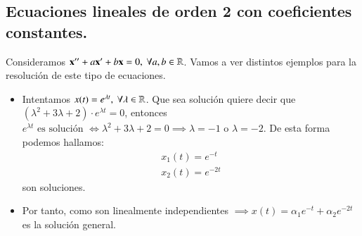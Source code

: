 \subsection{Ecuaciones lineales de orden 2 con coeficientes constantes.}
Consideramos $\mathbf{x}'' + a\mathbf{x}' + b\mathbf{x} = 0,\ \forall a,b \in \mathbb{R}$. Vamos a ver distintos ejemplos para la resolución de este tipo de ecuaciones.
\begin{eg}[Ecuación lineal de orden 2: $ \mbf{x}'' + 3\mbf{x}' + 2\mbf{x} = 0 $]
    \begin{itemize}
        \item Intentamos $x(t) = e^{\lambda t},\ \forall \lambda\in \R$. Que sea solución quiere decir que $(\lambda^2 + 3\lambda + 2)\cdot e^{\lambda t} = 0$, entonces $e^{\lambda t} \text{ es solución } \iff \lambda^2+3\lambda+2=0 \implies \lambda = -1 \text{ o } \lambda = -2 $. De esta forma podemos hallamos:
        \begin{gather*}
            x_1(t) = e^{-t}\\
            x_2(t) = e^{-2t}
        \end{gather*}son soluciones.
        \item Por tanto, como son linealmente independientes $\implies x(t) = \alpha_1 e^{-t} + \alpha_2 e^{-2t}$ es la solución general.
    \end{itemize}
\end{eg}
